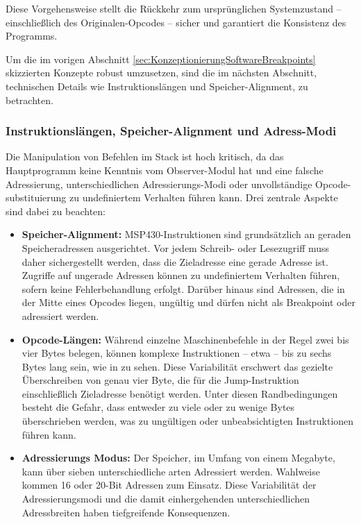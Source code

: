 Diese Vorgehensweise stellt die R\"uckkehr zum urspr\"unglichen Systemzustand – einschlie{\ss}lich des Originalen-Opcodes – sicher und garantiert die Konsistenz des Programms.

Um die im vorigen Abschnitt \ref{sec:KonzeptionierungSoftwareBreakpoints} skizzierten Konzepte robust umzusetzen, sind die im n\"achsten Abschnitt, technischen Details wie Instruktionsl\"angen und Speicher-Alignment, zu betrachten.\AI

\subsubsection{Instruktionsl\"angen, Speicher-Alignment und Adress-Modi}
\label{sec:TechnischeUmsetzunSoftwareBreakpoints}

Die Manipulation von Befehlen im Stack ist hoch kritisch, da das Hauptprogramm keine Kenntnis vom Observer-Modul hat und eine falsche Adressierung, unterschiedlichen Adressierungs-Modi oder unvollst\"andige Opcode-substituierung zu undefiniertem Verhalten f\"uhren kann. Drei zentrale Aspekte sind dabei zu beachten:

\begin{itemize}
	\item \textbf{Speicher-Alignment:} MSP430-Instruktionen sind grunds\"atzlich an geraden Speicheradressen ausgerichtet. Vor jedem Schreib- oder Lesezugriff muss daher sichergestellt werden, dass die Zieladresse eine gerade Adresse ist. Zugriffe auf ungerade Adressen k\"onnen zu undefiniertem Verhalten f\"uhren, sofern keine Fehlerbehandlung erfolgt. Dar\"uber hinaus sind Adressen, die in der Mitte eines Opcodes liegen, ung\"ultig und d\"urfen nicht als Breakpoint oder adressiert werden.
	
	\item \textbf{Opcode-L\"angen:} W\"ahrend einzelne Maschinenbefehle in der Regel zwei bis vier Bytes belegen, k\"onnen komplexe Instruktionen – etwa  – bis zu sechs Bytes lang sein, wie in  zu sehen.  Diese Variabilit\"at erschwert das gezielte \"Uberschreiben von genau vier Byte, die f\"ur die Jump-Instruktion einschlie{\ss}lich Zieladresse ben\"otigt werden. Unter diesen Randbedingungen besteht die Gefahr, dass entweder zu viele oder zu wenige Bytes \"uberschrieben werden, was zu ung\"ultigen oder unbeabsichtigten Instruktionen f\"uhren kann.
	
	\item \textbf{Adressierungs Modus:} Der Speicher, im Umfang von einem Megabyte, kann \"uber sieben unterschiedliche arten Adressiert werden. Wahlweise kommen 16 oder 20-Bit Adressen zum Einsatz. Diese Variabilit\"at der Adressierungsmodi und die damit einhergehenden unterschiedlichen Adressbreiten haben tiefgreifende Konsequenzen.
\end{itemize}

